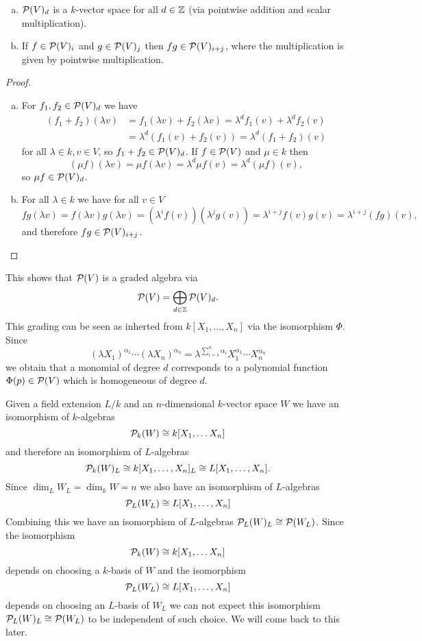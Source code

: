 \begin{lem}\leavevmode
 \begin{enumerate}[a)]
  \item
   $\mathcal{P}(V)_d$ is a $k$-vector space for all $d \in \mathbb{Z}$ (via pointwise addition and scalar multiplication).
  \item
   If $f \in \mathcal{P}(V)_i$ and $g \in \mathcal{P}(V)_j$  then $fg \in \mathcal{P}(V)_{i+j}$, where the multiplication is given by pointwise multiplication.
 \end{enumerate}
\end{lem}
\begin{proof}\leavevmode
 \begin{enumerate}[a)]
  \item For $f_1, f_2 \in \mathcal{P}(V)_d$ we have
  \begin{align*}
   (f_1+f_2)(\lambda v)
   &= f_1(\lambda v) + f_2(\lambda v)
   = \lambda^d f_1(v) + \lambda^d f_2(v) \\
   &= \lambda^d (f_1(v) + f_2(v))
   = \lambda^d (f_1 + f_2)(v)
  \end{align*}
  for all $\lambda \in k, v \in V$, so $f_1 + f_2 \in \mathcal{P}(V)_d$. If $f \in \mathcal{P}(V)$ and $\mu \in k$ then
  \[
   (\mu f)(\lambda v) = \mu f(\lambda v) = \lambda^d \mu f(v) = \lambda^d (\mu f)(v),
  \]
  so $\mu f \in \mathcal{P}(V)_d$.
  \item
  For all $\lambda \in k$ we have for all $v \in V$
  \[
   fg(\lambda v)
   = f(\lambda v) g(\lambda v)
   = \left(\lambda^i f(v)\right)\left(\lambda^j g(v)\right)
   = \lambda^{i+j} f(v) g(v)
   = \lambda^{i+j} (fg)(v),
  \]
  and therefore $fg \in \mathcal{P}(V)_{i+j}$. \qedhere
 \end{enumerate}
\end{proof}

This shows that $\mathcal{P}(V)$ is a graded algebra via
\[
  \mathcal{P}(V) = \bigoplus_{d \in \mathbb{Z}} \mathcal{P}(V)_d.
\]
This grading can be seen as inherted from $k[X_1, \dotsc, X_n]$ via the isomorphism $\Phi$. Since
\[
 (\lambda X_1)^{\alpha_1} \dotsm (\lambda X_n)^{\alpha_n}
 = \lambda^{\sum_{i=1}^n \alpha_i} X_1^{\alpha_1} \dotsm X_n^{\alpha_n}
\]
we obtain that a monomial of degree $d$ corresponds to a polynomial function $\Phi(p) \in \mathcal{P}(V)$ which is homogeneous of degree $d$.


Given a field extension $L/k$ and an $n$-dimensional $k$-vector space $W$ we have an isomorphism of $k$-algebras
\[
 \mathcal{P}_k(W) \cong k[X_1, \dotsc X_n]
\]
and therefore an isomorphism of $L$-algebras
\[
 \mathcal{P}_k(W)_L \cong k[X_1, \dotsc, X_n]_L \cong L[X_1, \dotsc, X_n].
\]
Since $\dim_L W_L = \dim_k W = n$ we also have an isomorphism of $L$-algebras
\[
 \mathcal{P}_L(W_L) \cong L[X_1, \dotsc, X_n]
\]
Combining this we have an isomorphism of $L$-algebras $\mathcal{P}_L(W)_L \cong \mathcal{P}(W_L)$. Since the isomorphism
\[
 \mathcal{P}_k(W) \cong k[X_1, \dotsc X_n]
\]
depends on choosing a $k$-basis of $W$ and the isomorphism
\[
 \mathcal{P}_L(W_L) \cong L[X_1, \dotsc, X_n]
\]
depends on choosing an $L$-basis of $W_L$ we can not expect this isomorphism $\mathcal{P}_L(W)_L \cong \mathcal{P}(W_L)$ to be independent of such choice. We will come back to this later.


